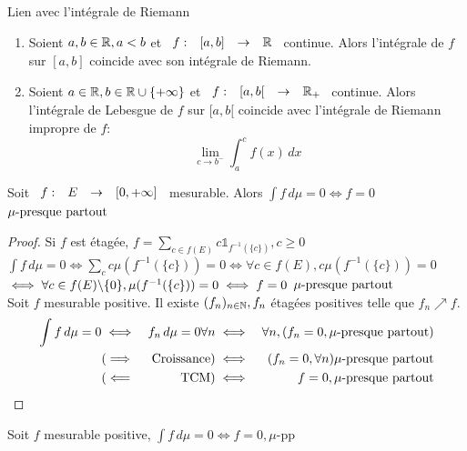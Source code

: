 \documentclass[]{report}
\begin{document}
    \begin{prop}{Lien avec l'intégrale de Riemann}{}
        \begin{enumerate}
            \item Soient $a,b\in \mathbb{R},a<b$ et $\begin{array}{ccccc} f : & [a,b] & \to & \mathbb{R} \end{array}$ continue. Alors l'intégrale de $f$ sur $[a,b]$ coincide avec son intégrale de Riemann.
            \item Soient $a\in\mathbb{R},b\in\mathbb{R}\cup\{+\infty\}$ et $\begin{array}{ccccc} f : & [a,b[ & \to & \mathbb{R}_+ \end{array}$ continue. Alors l'intégrale de Lebesgue de $f$ sur $[a,b[$ coincide avec l'intégrale de Riemann impropre de $f$: 
            \[\lim_{c\to b^-}\int_{a}^{c}f(x)\, dx\]
        \end{enumerate}
    \end{prop}

    \begin{lm}{}{}
        Soit $\begin{array}{ccccc} f : & E & \to & [0,+\infty] \end{array}$ mesurable. Alors $\int f\,d\mu=0\iff f=0$ $\mu\text{-presque partout}$
    \end{lm}

    \begin{proof}{}{}
        Si $f$ est étagée, $f=\sum_{c\in f(E)}c\mathbb{1}_{f^{-1}(\{c\})},c\ge 0$\\
        $\int f\,d\mu=0\iff\sum_c c\mu(f^{-1}(\{c\}))=0\iff\forall c\in f(E),c\mu(f^{-1}(\{c\}))=0$\\
        $\iff\forall c\in f(E)\backslash\{0\},\mu(f^{-1}(\{c\}))=0\iff f=0$ $\mu\text{-presque partout}$\\
        Soit $f$ mesurable positive. Il existe $(f_n)_{n\in\mathbb{N}},f_n$ étagées positives telle que $f_n\nearrow f$.\\
        \begin{align*}
            \int f\,d\mu=0&\iff& f_n\,d\mu=0\forall n&\iff&\forall n,(f_n=0,\mu\text{-presque partout})\\
            &(\implies&\text{Croissance})&\iff&(f_n=0,\forall n)\mu\text{-presque partout}\\
            &(\impliedby&\text{TCM})&\iff&f=0,\mu\text{-presque partout}
        \end{align*}
    \end{proof}

    \begin{lm}{}{}
        Soit $f$ mesurable positive, $\int f\,d\mu=0\iff f=0,\mu$-pp
    \end{lm}
\end{document}
